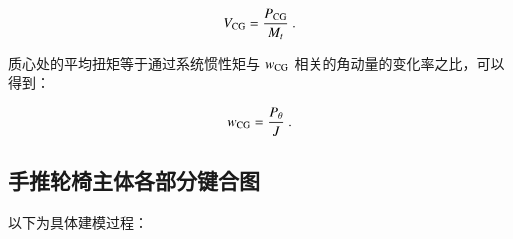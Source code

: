 	\begin{equation}
	\label{equ:V_CG}
	V_{\rm{CG}}
	=
	\frac{P_{\rm{CG}}}{M_t}
	\ .
	\end{equation}
	
	质心处的平均扭矩等于通过系统惯性矩与 $ w_{\rm{CG}} $ 相关的角动量的变化率之比，可以得到：
	
	\begin{equation}
	\label{equ:w_CG}
	w_{\rm{CG}}
	=
	\frac{P_{\theta}}{J}
	\ .
	\end{equation}

\subsection{手推轮椅主体各部分键合图}

	以下为具体建模过程：
	
